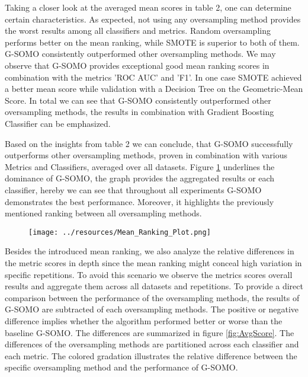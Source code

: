 \documentclass[parskip=full]{scrartcl}
\begin{document}
Taking a closer look at the averaged mean scores in table 2, one can determine certain characteristics. As expected, not using any oversampling method provides the worst results among all classifiers and metrics. Random oversampling performs better on the mean ranking, while SMOTE is superior to both of them. G-SOMO consistently outperformed other oversampling methods. We may observe that G-SOMO provides exceptional good mean ranking scores in combination with the metrics 'ROC AUC' and 'F1'. In one case SMOTE achieved a better mean score while validation with a Decision Tree on the Geometric-Mean Score. In total we can see that G-SOMO consistently outperformed other oversampling methods, the results in combination with Gradient Boosting Classifier can be emphasized. 

Based on the insights from table 2 we can conclude, that G-SOMO successfully outperforms other oversampling methods, proven in combination with various Metrics and Classifiers, averaged over all datasets. Figure \ref{fig:MeanRanking} underlines the dominance of G-SOMO, the graph provides the aggregated results or each classifier, hereby we can see that throughout all experiments G-SOMO demonstrates the best performance. Moreover, it highlights the previously mentioned ranking between all oversampling methods. 

\begin{figure}[H]
	\centering
	\texttt{[image: ../resources/Mean\_Ranking\_Plot.png]}
	\label{fig:MeanRanking}
\end{figure}



Besides the introduced mean ranking, we also analyze the relative differences in the metric scores in depth since the mean ranking might conceal high variation in specific repetitions. To avoid this scenario we observe the metrics scores overall results and aggregate them across all datasets and repetitions. To provide a direct comparison between the performance of the oversampling methods, the results of G-SOMO are subtracted of each oversampling methods. The positive or negative difference implies whether the algorithm performed better or worse than the baseline G-SOMO. The differences are summarized in figure \ref{fig:AvgScore}. The differences of the oversampling methods are partitioned across each classifier and each metric. The colored gradation illustrates the relative difference between the specific oversampling method and the performance of G-SOMO.
\end{document}
